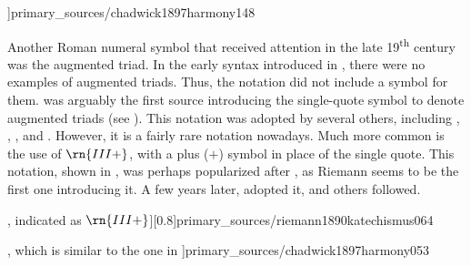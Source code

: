 \phdfigure[\gls{neapolitan} in
\textcite[p.~148]{chadwick1897harmony}]{primary_sources/chadwick1897harmony148}

Another Roman numeral symbol that received attention in the
late 19\textsuperscript{th} century was the augmented triad.
In the early syntax introduced in
\textcite{weber1818versuch}, there were no examples of
augmented triads. Thus, the notation did not include a
symbol for them. \textcite{richter1860lehrbuch} was arguably
the first source introducing the single-quote symbol to
denote augmented triads (see
). This
notation was adopted by several others, including
\textcite{jadassohn1883lehrbuch},
\textcite{broekhoven1889system}, \textcite{buwa1893schule},
and \textcite{shepard1896harmony}. However, it is a fairly
rare notation nowadays. Much more common is the use of
$\rn{III+}$, with a plus ($+$) symbol in place of the single
quote. This notation, shown in
, was
perhaps popularized after \textcite{riemann1890katechismus},
as Riemann seems to be the first one introducing it. A few
years later, \textcite{chadwick1897harmony} adopted it, and
others followed. 

\phdfigure[Augmented triads in
\textcite[p.~64]{riemann1890katechismus}, indicated as
$\rn{III+}$][0.8]{primary_sources/riemann1890katechismus064}

\phdfigure[The notation for augmented triads in
\textcite[p.~53]{chadwick1897harmony}, which is similar to
the one in
\textcite{riemann1890katechismus}]{primary_sources/chadwick1897harmony053}
